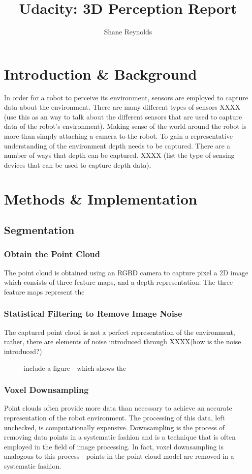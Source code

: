 \documentclass[a4paper]{article}
\begin{document}
\title{Udacity: 3D Perception Report}
\author{Shane Reynolds}
\maketitle
\section{Introduction \& Background}
In order for a robot to perceive its environment, sensors are employed to capture data about the environment. There are many different types of sensors XXXX (use this as an way to talk about the different sensors that are used to capture data of the robot's environment). Making sense of the world around the robot is more than simply attaching a camera to the robot. To gain a representative understanding of the environment depth needs to be captured. There are a number of ways that depth can be captured. XXXX (list the type of sensing devices that can be used to capture depth data). 

\section{Methods \& Implementation}
\subsection{Segmentation}
\subsubsection{Obtain the Point Cloud}
The point cloud is obtained using an RGBD camera to capture pixel a 2D image which consists of three feature maps, and a depth representation. The three feature maps represent the 

\subsubsection{Statistical Filtering to Remove Image Noise}
The captured point cloud is not a perfect representation of the environment, rather, there are elements of noise introduced through XXXX(how is the noise introduced?)

\begin{figure}
\centering
\caption{include a figure - which shows the }
\end{figure}

\subsubsection{Voxel Downsampling}
Point clouds often provide more data than necessary to achieve an accurate representation of the robot environment. The processing of this data, left unchecked, is computationally expensive. Downsampling is the process of removing data points in a systematic fashion and is a technique that is often employed in the field of image processing. In fact, voxel downsampling is analogous to this process - points in the point cloud model are removed in a systematic fashion. 
\end{document}
